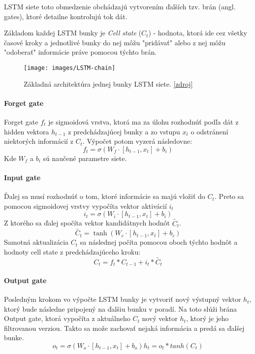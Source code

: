 \documentclass[12pt,a4paper]{article}
\begin{document}
			LSTM siete toto obmedzenie obchádzajú vytvorením ďalších tzv. brán (angl. gates), ktoré detailne kontrolujú tok dát.
			
			Základom každej LSTM bunky je \textit{Cell state} ($C_t$) - hodnota, ktorá ide cez všetky časové kroky a jednotlivé bunky do nej môžu "pridávať" alebo z nej môžu "odoberať" informácie práve pomocou týchto brán.
			
			\begin{figure}[h]
				\centering
				\texttt{[image: images/LSTM-chain]}
				\caption{Základná architektúra jednej bunky LSTM siete. \href{https://colah.github.io/posts/2015-08-Understanding-LSTMs/}{[zdroj]}}
				\label{fig:lstm-chain}
			\end{figure}
			
			
			\paragraph{Forget gate} Forget gate $f_t$ je sigmoidová vrstva, ktorá ma za úlohu rozhodnúť podľa dát z hidden vektora $h_{t-1}$ z predchádzajúcej bunky a zo vstupu $x_t$ o odstránení niektorých informácií z $C_t$.
			Výpočet potom vyzerá následovne:
			\[
			f_t = \sigma(W_f\cdot[h_{t-1},x_t] + b_i)
			\]
			Kde $W_f$ a $b_i$ sú naučené parametre siete.
			
			\paragraph{Input gate} Ďalej sa musí rozhodnúť o tom, ktoré informácie sa majú vložiť do $C_t$. Preto sa pomocou sigmoidovej vrstvy vypočíta vektor aktivácií $i_t$
			\[
			i_t = \sigma(W_i\cdot[h_{t-1},x_t] + b_i)
			\]
			Z ktorého sa ďalej spočíta vektor kandidátnych hodnôt $\tilde{C_t}$.
			\[
			\tilde{C_t} = \tanh(W_c\cdot[h_{t-1},x_t] + b_c)
			\]
			Samotná aktualizácia $C_t$ sa následnej počíta pomocou oboch týchto hodnôt a hodnoty cell state z predchádzajúceho kroku:
			\[
				C_t = f_t * C_{t-1} + i_t * \tilde{C_t}
			\]
			
			\paragraph{Output gate} Posledným krokom vo výpočte LSTM bunky je vytvoriť nový výstupný vektor $h_t$, ktorý bude následne pripojený na ďalšiu bunku v poradí. Na toto slúži brána Output gate, ktorá vypočíta z aktuálneho $C_t$ nový vektor $h_t$, ktorý je jeho filtrovanou verziou. Takto sa može zachovať nejaká informácia a predá sa ďalšej bunke.
			\[
			o_t = \sigma(W_o\cdot[h_{t-1},x_t] + b_o)
			h_t = o_t * tanh(C_t)
			\]
				
\end{document}
